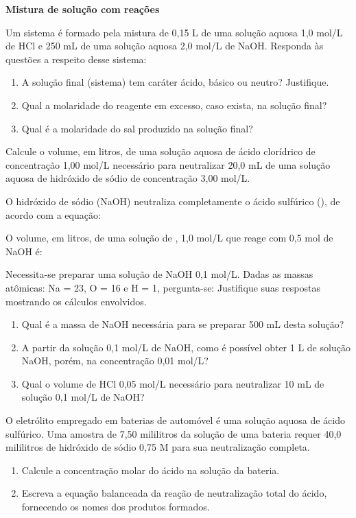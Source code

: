 \documentclass[a4paper,12]{exam}
\begin{document}
\begin{multicols}{2}
\begin{questions}
  \begin{center}
\textbf{Mistura de solução com reações}
  \end{center}

  \question Um sistema é formado pela mistura de 0,15 L de uma solução aquosa 1,0 mol/L de HCl e 250 mL de uma solução aquosa 2,0 mol/L de NaOH. Responda às questões a respeito desse sistema:
  \begin{enumerate}[label=\alph*)]
    \item A solução final (sistema) tem caráter ácido, básico ou neutro? Justifique. \fillwithlines{8em}
    \item Qual a molaridade do reagente em excesso, caso exista, na solução final? \fillwithlines{4em}
    \item Qual é a molaridade do sal produzido na solução final? \fillwithlines{4em}
  \end{enumerate}
 \makeemptybox{2cm}

  \question Calcule o volume, em litros, de uma solução aquosa de ácido clorídrico de concentração 1,00 mol/L necessário para neutralizar 20,0 mL de uma solução aquosa de hidróxido de sódio de concentração 3,00 mol/L. \makeemptybox{2cm}

  \question O hidróxido de sódio (NaOH) neutraliza completamente o ácido sulfúrico (), de acordo com a equação:
  \begin{center}
    \end{center}
O volume, em litros, de uma solução de , 1,0 mol/L que reage com 0,5 mol de
NaOH é:\makeemptybox{2cm}

\question Necessita-se preparar uma solução de NaOH 0,1 mol/L. Dadas as massas atômicas: Na = 23, O = 16 e H = 1, pergunta-se:
Justifique suas respostas mostrando os cálculos envolvidos.
    \begin{enumerate}[label=\alph*)]
        \item Qual é a massa de NaOH necessária para se preparar 500 mL desta solução? \makeemptybox{2cm}
        \item A partir da solução 0,1 mol/L de NaOH, como é possível obter 1 L de solução NaOH, porém, na concentração 0,01 mol/L? \makeemptybox{2cm}
        \item Qual o volume de HCl 0,05 mol/L necessário para neutralizar 10 mL de solução 0,1 mol/L de NaOH? \makeemptybox{2cm}
    \end{enumerate}

    \question O eletrólito empregado em baterias de automóvel é uma solução aquosa de ácido sulfúrico. Uma amostra de 7,50 mililitros da solução de uma bateria requer 40,0 mililitros de hidróxido de sódio 0,75 M para sua neutralização completa.
    \begin{enumerate}[label=\alph*)]
\item Calcule a concentração molar do ácido na solução da bateria. \makeemptybox{2cm}
\item Escreva a equação balanceada da reação de neutralização total do ácido, fornecendo os nomes dos produtos formados. \makeemptybox{2cm}
    \end{enumerate}


\end{questions}
\end{multicols}
\end{document}
